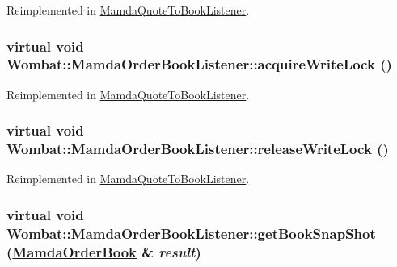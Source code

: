 Reimplemented in \hyperlink{classMamdaQuoteToBookListener_04933309e7df1a0afd2aa8d173e20c7c}{Mamda\-Quote\-To\-Book\-Listener}.\hypertarget{classWombat_1_1MamdaOrderBookListener_601244fd9fd694d64dc54a568e8f5b06}{
\subsubsection[acquireWriteLock]{\setlength{\rightskip}{0pt plus 5cm}virtual void Wombat::Mamda\-Order\-Book\-Listener::acquire\-Write\-Lock ()}}
\label{classWombat_1_1MamdaOrderBookListener_601244fd9fd694d64dc54a568e8f5b06}




Reimplemented in \hyperlink{classMamdaQuoteToBookListener_e29f743ba0e51a46e8eccf33ac196bfc}{Mamda\-Quote\-To\-Book\-Listener}.\hypertarget{classWombat_1_1MamdaOrderBookListener_184fb4af88e62c4d77fb54f52ac3bcb8}{
\subsubsection[releaseWriteLock]{\setlength{\rightskip}{0pt plus 5cm}virtual void Wombat::Mamda\-Order\-Book\-Listener::release\-Write\-Lock ()}}
\label{classWombat_1_1MamdaOrderBookListener_184fb4af88e62c4d77fb54f52ac3bcb8}




Reimplemented in \hyperlink{classMamdaQuoteToBookListener_6c24b1f262c4d571b586fd0c9f5675ee}{Mamda\-Quote\-To\-Book\-Listener}.\hypertarget{classWombat_1_1MamdaOrderBookListener_da7f0348273e2877d9a27ae48406a59a}{
\subsubsection[getBookSnapShot]{\setlength{\rightskip}{0pt plus 5cm}virtual void Wombat::Mamda\-Order\-Book\-Listener::get\-Book\-Snap\-Shot (\hyperlink{classWombat_1_1MamdaOrderBook}{Mamda\-Order\-Book} \& {\em result})}}
\label{classWombat_1_1MamdaOrderBookListener_da7f0348273e2877d9a27ae48406a59a}


